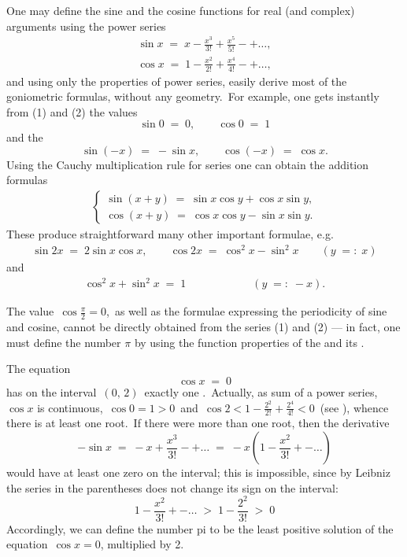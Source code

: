 \documentclass[12pt]{article}
\theoremstyle{definition}
\begin{document}
One may define the sine and the cosine functions for real (and complex) arguments using the power series
\begin{align}
\sin{x} \;=\; x-\frac{x^3}{3!}+\frac{x^5}{5!}-+\ldots,
\end{align}
\begin{align}
\cos{x} \;=\; 1-\frac{x^2}{2!}+\frac{x^4}{4!}-+\ldots,
\end{align}
and using only the properties of power series, easily derive most of the goniometric formulas, without any geometry.\, For example, one gets instantly from (1) and (2) the values
$$\sin0 \;=\; 0, \qquad \cos0 \;=\; 1$$
and the 
$$\sin(-x) \;=\; -\sin{x}, \qquad \cos(-x) \;=\; \cos{x}.$$
Using the Cauchy multiplication rule for series one can obtain the addition formulas
\begin{align}
\begin{cases}
   \sin(x\!+\!y) \;=\; \sin{x}\cos{y}+\cos{x}\sin{y},\\
   \cos(x\!+\!y) \;=\; \cos{x}\cos{y}-\sin{x}\sin{y}.
\end{cases}
\end{align}
These produce straightforward many other important formulae, e.g.
\begin{align}
\sin2x \;=\; 2\sin{x}\cos{x}, \qquad \cos2x \;=\; \cos^2x-\sin^2x \qquad (y \;=:\; x)
\end{align}
and
\begin{align}
\cos^2x+\sin^2x \;=\; 1 \qquad\qquad\qquad (y \;=:\; -x).
\end{align}


The value\, $\displaystyle\cos\frac{\pi}{2} = 0$,\, as well as the formulae expressing the periodicity of sine and cosine, cannot be directly obtained from the series (1) and (2) --- in fact, one must define the number $\pi$ by using the function properties of the  and its .

The equation
$$\cos{x} \;=\; 0$$
has on the interval \,$(0,\,2)$\, exactly one .\, Actually, as sum of a power series, 
$\cos{x}$ is continuous,\, $\cos0 = 1 > 0$\, and\, $\cos2 < 1-\frac{2^2}{2!}+\frac{2^4}{4!} < 0$\, (see ), whence there is at least one root.\, If there were more than one root, then the derivative
$$-\sin{x} \;=\; -x+\frac{x^3}{3!}-+\ldots \;=\; -x(1-\frac{x^2}{3!}+-\ldots)$$
would have at least one zero on the interval; this is impossible, since by Leibniz the series in the parentheses does not change its sign on the interval:
$$1-\frac{x^2}{3!}+-\ldots \;>\;1-\frac{2^2}{3!} \;>\; 0$$
Accordingly, we can define the number pi to be the least positive solution of the equation\, $\cos{x} = 0$, multiplied by 2.
\end{document}
